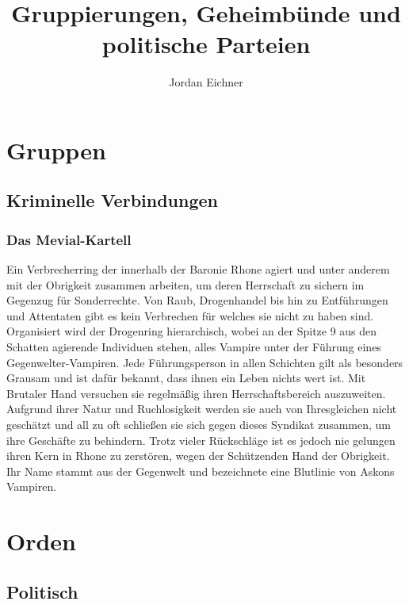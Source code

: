 \documentclass[a4paper,12pt,oneside]{book}
\title{Gruppierungen, Geheimbünde und politische Parteien}
\author{Jordan Eichner}
\date{}
\begin{document}
\maketitle
\tableofcontents

\part{Gruppen}

\chapter{Kriminelle Verbindungen}

\section{Das Mevial-Kartell}
Ein Verbrecherring der innerhalb der Baronie Rhone agiert und unter anderem mit der Obrigkeit zusammen arbeiten, um deren Herrschaft zu sichern im Gegenzug für Sonderrechte. Von Raub, Drogenhandel bis hin zu Entführungen und Attentaten gibt es kein Verbrechen für welches sie nicht zu haben sind. Organisiert wird der Drogenring hierarchisch, wobei an der Spitze 9 aus den Schatten agierende Individuen stehen, alles Vampire unter der Führung eines Gegenwelter-Vampiren. Jede Führungsperson in allen Schichten gilt als besonders Grausam und ist dafür bekannt, dass ihnen ein Leben nichts wert ist. Mit Brutaler Hand versuchen sie regelmäßig ihren Herrschaftsbereich auszuweiten. Aufgrund ihrer Natur und Ruchlosigkeit werden sie auch von Ihresgleichen nicht geschätzt und all zu oft schließen sie sich gegen dieses Syndikat zusammen, um ihre Geschäfte zu behindern. Trotz vieler Rückschläge ist es jedoch nie gelungen ihren Kern in Rhone zu zerstören, wegen der Schützenden Hand der Obrigkeit. Ihr Name stammt aus der Gegenwelt und bezeichnete eine Blutlinie von Askons Vampiren.

\part{Orden}

\chapter{Politisch}
\end{document}
